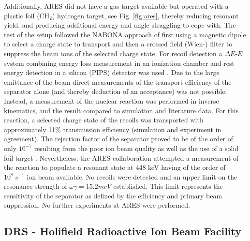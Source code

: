 Additionally, ARES did not have a gas target available but operated with a plastic foil (CH$_2$) hydrogen target, see Fig. \ref{fig:ares}, thereby reducing resonant yield, and producing additional energy and angle straggling to cope with. The rest of the setup followed the NABONA approach of first using a magnetic dipole to select a charge state to transport and then a crossed field (Wien-) filter to suppress the beam ions of the selected charge state. For recoil detection a $\Delta{}E$-$E$ system combining energy loss measurement in an ionization chamber and rest energy detection in a silicon (PIPS) detector was used \cite{coud03}. Due to the large emittance of the beam direct measurements of the transport efficiency of the separator alone (and thereby deduction of an acceptance) was not possible. Instead, a measurement of the nuclear reaction  was performed in inverse kinematics, and the result compared to simulation and literature data. For this reaction, a selected charge state of the  recoils was transported with approximately 11\% transmission efficiency (simulation and experiment in agreement). The rejection factor of the separator proved to be of the order of only $10^{-7}$ resulting from the poor ion beam quality as well as the use of a solid foil target \cite{angu01,coud05}. Nevertheless, the ARES collaboration attempted a measurement of the  reaction to populate a resonant state at 448 keV having of the order of $10^8 ~\unit{s^{-1}}$  ion beam available. No recoils were detected and an upper limit on the resonance strength of $\omega\gamma = 15.2 \unit{meV}$ established. This limit represents the sensitivity of the separator as defined by the efficiency and primary beam suppression. No further experiments at ARES were performed.

\subsection{DRS - Holifield Radioactive Ion Beam Facility}

